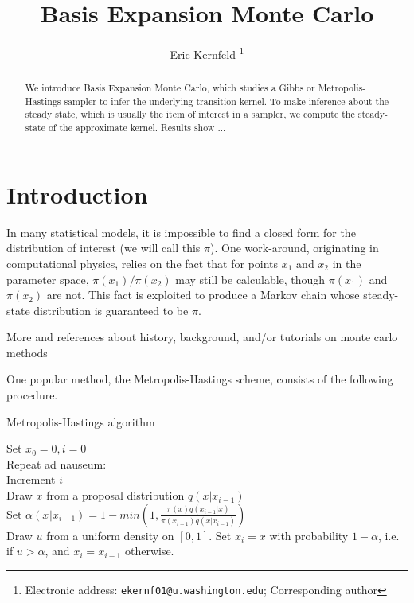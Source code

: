 \documentclass{article}
\begin{document}
\title{Basis Expansion Monte Carlo}

\author{Eric Kernfeld
  \thanks{Electronic address: \texttt{ekernf01@u.washington.edu}; Corresponding author}}
\maketitle

\begin{abstract}
We introduce Basis Expansion Monte Carlo, which studies a Gibbs or Metropolis-Hastings sampler to infer the underlying transition kernel. To make inference about the steady state, which is usually the item of interest in a sampler, we compute the steady-state of the approximate kernel. Results show ...
\end{abstract}


\section{Introduction}
In many statistical models, it is impossible to find a closed form for the distribution of interest (we will call this $\pi$). One work-around, originating in computational physics, relies on the fact that for points $x_1$ and $x_2$ in the parameter space, $\pi(x_1)/\pi(x_2)$ may still be calculable, though $\pi(x_1)$ and $\pi(x_2)$ are not. This fact is exploited to produce a Markov chain whose steady-state distribution is guaranteed to be $\pi$. 

More and references about history, background, and/or tutorials on monte carlo methods



One popular method, the Metropolis-Hastings scheme, consists of the following procedure.

\begin{algorithm}[h]
\caption{Metropolis-Hastings algorithm}
Set $x_0 = 0, i=0$\\
Repeat ad nauseum:\\
\Indp
Increment $i$\\
Draw $x$ from a proposal distribution $q(x|x_{i-1})$\\
Set $\alpha(x_{}|x_{i-1}) = 1 - min(1, \frac{\pi(x)q(x_{i-1}|x)}{\pi(x_{i-1})q(x|x_{i-1})})$\\
Draw $u$ from a uniform density on $[0,1]$.
Set $x_i = x$ with probability $1 - \alpha$, i.e. if $u >\alpha$, and $x_i = x_{i-1}$ otherwise.\\
\end{algorithm}
\end{document}
